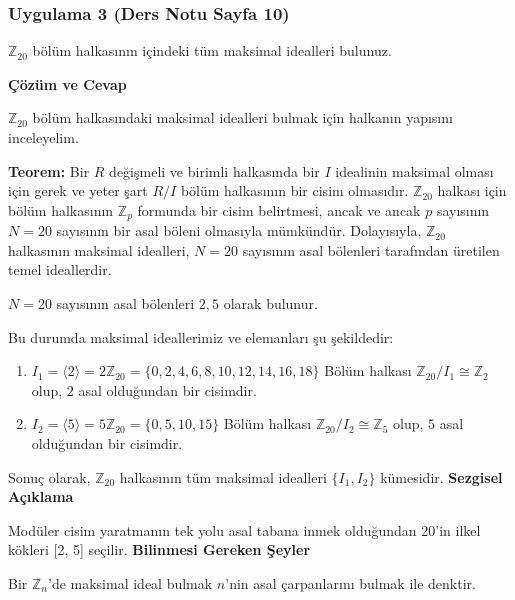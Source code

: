\documentclass[11pt, a4paper]{article}
\newenvironment{cozum}{
    \vspace{0.5cm}
    \noindent\textcolor{green!60!black}{\faCheckCircle\enspace \textbf{\Large Çözüm ve Cevap}}\par\vspace{0.2cm}
}{}
\newenvironment{sezgisel}{
    \vspace{0.5cm}
    \noindent\textcolor{orange!80!black}{\faLightbulb\enspace \textbf{\Large Sezgisel Açıklama}}\par\vspace{0.2cm}
    \itshape
}{}
\newenvironment{bilgi}{
    \vspace{0.5cm}
    \noindent\textcolor{red!70!black}{\faExclamationTriangle\enspace \textbf{\Large Bilinmesi Gereken Şeyler}}\par\vspace{0.2cm}
}{}
\begin{document}
\subsubsection{Uygulama 3 (Ders Notu Sayfa 10)}
\begin{sorubox}
$\mathbb{Z}_{20}$ bölüm halkasının içindeki tüm maksimal idealleri bulunuz.
\end{sorubox}
\begin{cozum}
$\mathbb{Z}_{20}$ bölüm halkasındaki maksimal idealleri bulmak için halkanın yapısını inceleyelim.

\textbf{Teorem:} Bir $R$ değişmeli ve birimli halkasında bir $I$ idealinin maksimal olması için gerek ve yeter şart $R/I$ bölüm halkasının bir cisim olmasıdır. $\mathbb{Z}_{20}$ halkası için bölüm halkasının $\mathbb{Z}_p$ formunda bir cisim belirtmesi, ancak ve ancak $p$ sayısının $N = 20$ sayısının bir asal böleni olmasıyla mümkündür. Dolayısıyla, $\mathbb{Z}_{20}$ halkasının maksimal idealleri, $N = 20$ sayısının asal bölenleri tarafından üretilen temel ideallerdir.

$N = 20$ sayısının asal bölenleri $2, 5$ olarak bulunur.

Bu durumda maksimal ideallerimiz ve elemanları şu şekildedir:
\begin{enumerate}
    \item $I_{1} = \langle 2 \rangle = 2\mathbb{Z}_{20} = \{0, 2, 4, 6, 8, 10, 12, 14, 16, 18\}$
    Bölüm halkası $\mathbb{Z}_{20} / I_{1} \cong \mathbb{Z}_{2}$ olup, $2$ asal olduğundan bir cisimdir.
    \item $I_{2} = \langle 5 \rangle = 5\mathbb{Z}_{20} = \{0, 5, 10, 15\}$
    Bölüm halkası $\mathbb{Z}_{20} / I_{2} \cong \mathbb{Z}_{5}$ olup, $5$ asal olduğundan bir cisimdir.
\end{enumerate}

Sonuç olarak, $\mathbb{Z}_{20}$ halkasının tüm maksimal idealleri $\{I_1, I_2\}$ kümesidir.
\end{cozum}
\begin{sezgisel}
Modüler cisim yaratmanın tek yolu asal tabana inmek olduğundan 20'in ilkel kökleri [2, 5] seçilir.
\end{sezgisel}
\begin{bilgi}
Bir $\mathbb{Z}_n$'de maksimal ideal bulmak $n$'nin asal çarpanlarını bulmak ile denktir.
\end{bilgi}

\newpage
\end{document}
